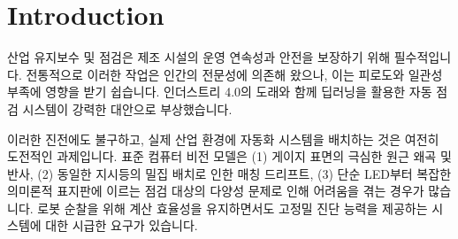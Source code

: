 \section{Introduction}
\label{sec:introduction}
산업 유지보수 및 점검은 제조 시설의 운영 연속성과 안전을 보장하기 위해 필수적입니다.
전통적으로 이러한 작업은 인간의 전문성에 의존해 왔으나, 이는 피로도와 일관성 부족에 영향을 받기 쉽습니다.
인더스트리 4.0의 도래와 함께 딥러닝을 활용한 자동 점검 시스템이 강력한 대안으로 부상했습니다.

이러한 진전에도 불구하고, 실제 산업 환경에 자동화 시스템을 배치하는 것은 여전히 도전적인 과제입니다.
표준 컴퓨터 비전 모델은 (1) 게이지 표면의 극심한 원근 왜곡 및 반사, (2) 동일한 지시등의 밀집 배치로 인한 매칭 드리프트, (3) 단순 LED부터 복잡한 의미론적 표지판에 이르는 점검 대상의 다양성 문제로 인해 어려움을 겪는 경우가 많습니다.
로봇 순찰을 위해 계산 효율성을 유지하면서도 고정밀 진단 능력을 제공하는 시스템에 대한 시급한 요구가 있습니다.

